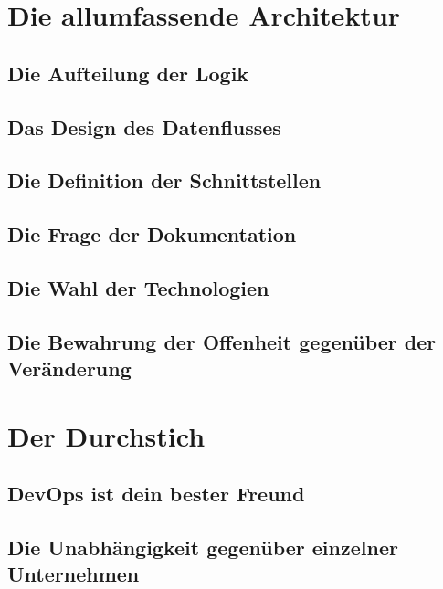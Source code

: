 \chapter{Die allumfassende Architektur}
\label{chap:die-allumfassende-architektur}

\section{Die Aufteilung der Logik}
\label{sec:die-aufteilung-der-logic}

\section{Das Design des Datenflusses}
\label{sec:das-design-des-datenflusses}

\section{Die Definition der Schnittstellen}
\label{sec:die-definition-der-schnittstellen}

\section{Die Frage der Dokumentation}

\section{Die Wahl der Technologien}

\section{Die Bewahrung der Offenheit gegenüber der Veränderung}
\label{sec:die-bewahrung-der-offenheit-gegenueber-der-veraenderung}

\chapter{Der Durchstich}

\section{DevOps ist dein bester Freund}

\section{Die Unabhängigkeit gegenüber einzelner Unternehmen}
